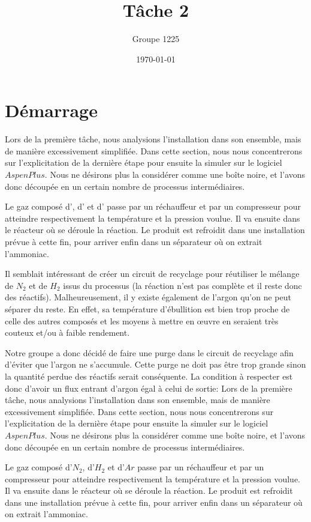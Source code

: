 \documentclass[a4paper, oneside, 12pt]{article}
\title{Tâche 2}
\author{Groupe 1225}
\date{\today}
\begin{document}
\maketitle

\section{Démarrage}

Lors de la première tâche, nous analysions l'installation dans son ensemble, 
mais de manière excessivement simplifiée. 
Dans cette section, nous nous concentrerons sur l'explicitation de la dernière étape 
pour ensuite la simuler sur le logiciel $Aspen Plus$. 
Nous ne désirons plus la considérer comme une boîte noire, et l'avons donc découpée 
en un certain nombre de processus intermédiaires. 

Le gaz composé d', d' et d' passe par un réchauffeur et par un compresseur 
pour atteindre respectivement la température et la pression voulue. 
Il va ensuite dans le réacteur où se déroule la réaction.
Le produit est refroidit dans une installation prévue à cette fin, 
pour arriver enfin dans un séparateur où on extrait l'ammoniac.

Il semblait intéressant de créer un circuit de recyclage pour réutiliser 
le mélange de $N_2$ et de $H_2$ issus du processus (la réaction n'est pas complète 
et il reste donc des réactifs). Malheureusement, il y existe également de l'argon 
qu'on ne peut séparer du reste. En effet, sa température d'ébullition est bien trop 
proche de celle des autres composés et les moyens à mettre en œuvre en seraient 
très couteux et/ou à faible rendement.

Notre groupe a donc décidé de faire une purge dans le circuit de recyclage 
afin d'éviter que l'argon ne s'accumule. Cette purge ne doit pas être trop 
grande sinon la quantité perdue des réactifs serait conséquente. 
La condition à respecter est donc d'avoir un flux entrant d'argon égal à celui de sortie:
Lors de la première tâche, nous analysions l'installation dans son ensemble, 
mais de manière excessivement simplifiée. Dans cette section, 
nous nous concentrerons sur l'explicitation de la dernière étape pour 
ensuite la simuler sur le logiciel $Aspen Plus$. 
Nous ne désirons plus la considérer comme une boîte noire, 
et l'avons donc découpée en un certain nombre de processus intermédiaires.

Le gaz composé d'$N_2$, d'$H_2$ et d'$Ar$ passe par un réchauffeur et 
par un compresseur pour atteindre respectivement la température et la pression voulue. 
Il va ensuite dans le réacteur où se déroule la réaction. 
Le produit est refroidit dans une installation prévue à cette fin, 
pour arriver enfin dans un séparateur où on extrait l'ammoniac. 
\end{document}
